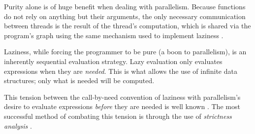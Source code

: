 
Purity alone is of huge benefit when dealing with parallelism. Because
functions do not rely on anything but their arguments, the only necessary communication
between threads is the result of the thread's computation, which is
shared via the program's graph using the same mechanism used to implement
laziness \citep{SPJ:PIFPL}.

Laziness, while forcing the programmer to be pure (a boon to parallelism), is
an inherently sequential evaluation strategy. Lazy evaluation only evaluates
expressions when they are \emph{needed}. This is what allows the use of
infinite data structures; only what is needed will be computed.

This tension between the call-by-need convention of laziness with parallelism's
desire to evaluate expressions \emph{before} they are needed is well known
\citep{tremblay1995impact}. The most successful method of combating this tension
is through the use of \emph{strictness analysis} \citep{mycroft1980theory,
wadler1987projections, hinze1995projection}.
